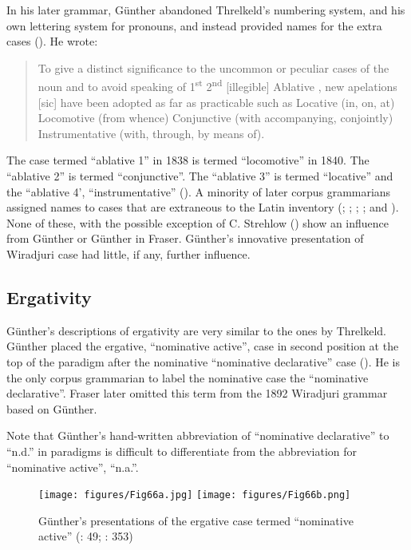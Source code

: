 In his later grammar, Günther abandoned Threlkeld’s numbering system, and his own lettering system for pronouns, and instead provided names for the extra cases (). He wrote: 

\begin{quote}
    To give a distinct significance to the uncommon or peculiar cases of the noun and to avoid speaking of 1\textsuperscript{st} 2\textsuperscript{nd} [illegible] Ablative , new apelations [sic] have been adopted as far as practicable such as Locative (in, on, at) Locomotive (from whence) Conjunctive (with accompanying, conjointly) Instrumentative (with, through, by means of). \citep[346--347]{gunther_lecture_1840}
\end{quote}


\largerpage
The case termed “ablative 1” in 1838 is termed “locomotive” in 1840. The “ablative 2” is termed ``conjunctive''. The “ablative 3” is termed “locative” and the “ablative 4’, “instrumentative” (). A minority of later corpus grammarians assigned names to cases that are extraneous to the Latin inventory (\citealt{meyer_vocabulary_1843,taplin_vocabulary_1867}; \citealt{taplin_notes_1872}; \citealt{taplin_grammar_1878}; \citealt{hagenauer_language_1878}; \citealt{bulmer_language_1878} and \citealt{strehlow_einige_1908,strehlow_notitle_1910}). None of these, with the possible exception of C. Strehlow () show an influence from Günther or Günther in Fraser. Günther’s innovative presentation of Wiradjuri case had little, if any, further influence.

\subsection{Ergativity}
\label{sec:key:4.4.4}

Günther’s descriptions of ergativity are very similar to the ones by Threlkeld. Günther placed the ergative, ``nominative active'', case in second position at the top of the paradigm after the nominative “nominative declarative” case (). He is the only corpus grammarian to label the nominative case the ``nominative declarative''. Fraser later omitted this term from the 1892 Wiradjuri grammar based on Günther.

Note that Günther’s hand-written abbreviation of “nominative declarative” to “n.d.” in paradigms is difficult to differentiate from the abbreviation for “nominative active”, ``n.a.''.

\begin{figure}
\texttt{[image: figures/Fig66a.jpg]}%
\texttt{[image: figures/Fig66b.png]}
\caption{Günther’s presentations of the ergative case termed “nominative active” (\citeyear{gunther_native_1838}: 49; \citeyear{gunther_lecture_1840}: 353)}
\label{fig:4:66}
\end{figure}  


